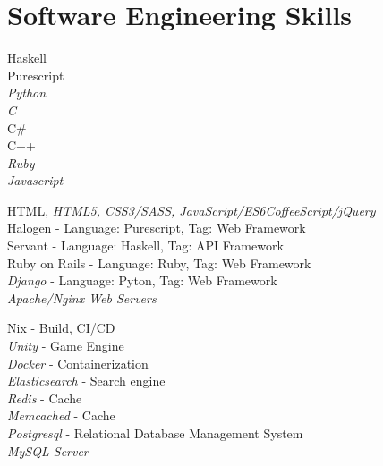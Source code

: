 \documentclass[10pt]{article} %
\begin{document}
\section{Software Engineering Skills}

{
Haskell\\
Purescript\\
\textit{Python}\\
\textit{C}\\
C\#\\
C++\\
\textit{Ruby}\\
\textit{Javascript}
}


{
HTML, \textit{HTML5, CSS3/SASS, JavaScript/ES6CoffeeScript/jQuery}\\
Halogen       - Language: Purescript, Tag: Web Framework\\
Servant       - Language: Haskell, Tag: API Framework\\
Ruby on Rails - Language: Ruby, Tag: Web Framework\\
\textit{Django}        - Language: Pyton, Tag: Web Framework \\
\textit{Apache/Nginx Web Servers}
}


{
Nix - Build, CI/CD\\
\textit{Unity} - Game Engine\\
\textit{Docker} - Containerization \\
\textit{Elasticsearch} - Search engine\\
\textit{Redis} - Cache\\
\textit{Memcached} - Cache\\
\textit{Postgresql} - Relational Database Management System\\
\textit{MySQL Server}
}
\end{document}
